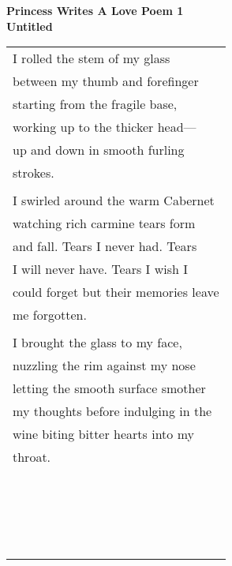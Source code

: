 \documentclass{article}
\begin{document}
\begin{center}
\textbf{Princess Writes A Love Poem 1} \\
{\small\textbf{Untitled}} \\
\vspace*{2ex}
\begin{tabular}{l}
I rolled the stem of my glass \\
between my thumb and forefinger \\
starting from the fragile base, \\
working up to the thicker head--- \\
up and down in smooth furling \\
strokes. \\
\\
I swirled around the warm Cabernet \\
watching rich carmine tears form \\
and fall.  Tears I never had.  Tears \\
I will never have.  Tears I wish I \\
could forget but their memories leave \\
me forgotten. \\
\\
I brought the glass to my face, \\
nuzzling the rim against my nose \\
letting the smooth surface smother \\
my thoughts before indulging in the \\
wine biting bitter hearts into my \\
throat. \\
\\ \\ \\ \\ \\ \\ \\ \\ \\
\\
\\ \\ \\ \\ \\ \\ \\ \\ \\
\end{tabular}
\begin{tabular}{l}

\end{tabular}
\end{center}
\end{document}

